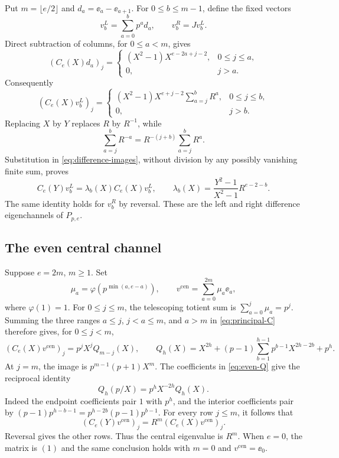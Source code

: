 Put \(m=\lfloor e/2\rfloor\) and \(d_a=\ee_a-\ee_{a+1}\).
For \(0\le b\le m-1\), define the fixed vectors
\begin{equation}\label{eq:difference-vectors}
 v_b^L=\sum_{a=0}^b p^a d_a,\qquad v_b^R=Jv_b^L.
\end{equation}
Direct subtraction of columns, for \(0\le a<m\), gives
\[
 (C_e(X)d_a)_j=
 \begin{cases}
 (X^2-1)X^{e-2a+j-2},&0\le j\le a,\\
 0,&j>a.
 \end{cases}
\]
Consequently
\begin{equation}\label{eq:difference-images}
 (C_e(X)v_b^L)_j=
 \begin{cases}
 (X^2-1)X^{e+j-2}\displaystyle\sum_{a=j}^b R^a,&0\le j\le b,\\
 0,&j>b.
 \end{cases}
\end{equation}
Replacing \(X\) by \(Y\) replaces \(R\) by \(R^{-1}\), while
\[
 \sum_{a=j}^b R^{-a}=R^{-(j+b)}\sum_{a=j}^b R^a .
\]
Substitution in \eqref{eq:difference-images}, without division by
any possibly vanishing finite sum, proves
\begin{equation}\label{eq:difference-eigenvalue}
 C_e(Y)v_b^L=\lambda_b(X)C_e(X)v_b^L,\qquad
 \lambda_b(X)=\frac{Y^2-1}{X^2-1}R^{e-2-b}.
\end{equation}
The same identity holds for \(v_b^R\) by reversal. These are the
left and right difference eigenchannels of \(P_{p,e}\).

\subsection{The even central channel}

Suppose \(e=2m\), \(m\ge1\). Set
\[
 \mu_a=\varphi(p^{\min(a,e-a)}),\qquad
 v^{\mathrm{cen}}=\sum_{a=0}^{2m}\mu_a\ee_a,
\]
where \(\varphi(1)=1\).
For \(0\le j\le m\), the telescoping totient sum is
\(\sum_{a=0}^j\mu_a=p^j\).
Summing the three ranges \(a\le j\), \(j<a\le m\), and \(a>m\)
in \eqref{eq:principal-C} therefore gives, for \(0\le j<m\),
\begin{equation}\label{eq:even-Q}
 (C_e(X)v^{\mathrm{cen}})_j=p^jX^jQ_{m-j}(X),\qquad
 Q_h(X)=X^{2h}+(p-1)\sum_{b=1}^{h-1}p^{b-1}X^{2h-2b}+p^h.
\end{equation}
At \(j=m\), the image is \(p^{m-1}(p+1)X^m\).
The coefficients in \eqref{eq:even-Q} give the reciprocal identity
\[
 Q_h(p/X)=p^hX^{-2h}Q_h(X).
\]
Indeed the endpoint coefficients pair \(1\) with \(p^h\), and the
interior coefficients pair by
\((p-1)p^{h-b-1}=p^{h-2b}(p-1)p^{b-1}\).
For every row \(j\le m\), it follows that
\[
 (C_e(Y)v^{\mathrm{cen}})_j
 =R^m(C_e(X)v^{\mathrm{cen}})_j .
\]
Reversal gives the other rows. Thus the central eigenvalue is \(R^m\).
When \(e=0\), the matrix is \((1)\) and the same conclusion holds
with \(m=0\) and \(v^{\mathrm{cen}}=\ee_0\).

